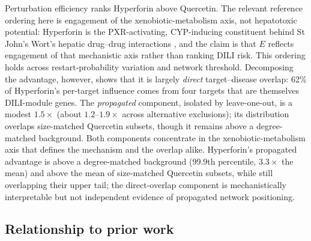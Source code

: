 Perturbation efficiency ranks Hyperforin above Quercetin. The relevant reference ordering here is engagement of the xenobiotic-metabolism axis, not hepatotoxic potential: Hyperforin is the PXR-activating, CYP-inducing constituent behind St John's Wort's hepatic drug--drug interactions \citep{Moore2000, Watkins2001, Chen2022}, and the claim is that $E$ reflects engagement of that mechanistic axis rather than ranking DILI risk. This ordering holds across restart-probability variation and network threshold. Decomposing the advantage, however, shows that it is largely \emph{direct} target--disease overlap: 62\% of Hyperforin's per-target influence comes from four targets that are themselves DILI-module genes. The \emph{propagated} component, isolated by leave-one-out, is a modest $1.5\times$ (about $1.2$--$1.9\times$ across alternative exclusions); its distribution overlaps size-matched Quercetin subsets, though it remains above a degree-matched background. Both components concentrate in the xenobiotic-metabolism axis that defines the mechanism and the overlap alike. Hyperforin's propagated advantage is above a degree-matched background (99.9th percentile, $3.3\times$ the mean) and above the mean of size-matched Quercetin subsets, while still overlapping their upper tail; the direct-overlap component is mechanistically interpretable but not independent evidence of propagated network positioning.

\subsection{Relationship to prior work}

